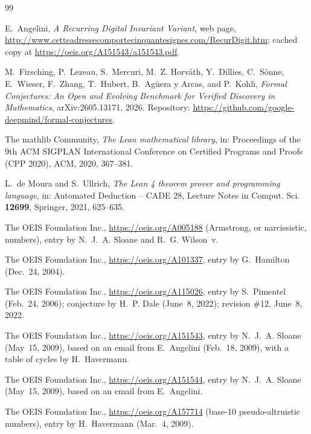 \documentclass[11pt]{amsart}
\theoremstyle{plain}
\theoremstyle{definition}
\begin{document}
{\small
\begin{thebibliography}{99}

E.~Angelini, \emph{A Recurring Digital Invariant Variant}, web page, \url{http://www.cetteadressecomportecinquantesignes.com/RecurDigit.htm}; cached copy at \url{https://oeis.org/A151543/a151543.pdf}.

M.~Firsching, P.~Lezeau, S.~Mercuri, M.~Z. Horv\'ath, Y.~Dillies, C.~S\"onne, E.~Wieser, F.~Zhang, T.~Hubert, B.~Ag\"uera y Arcas, and P.~Kohli, \emph{Formal Conjectures: An Open and Evolving Benchmark for Verified Discovery in Mathematics}, arXiv:2605.13171, 2026. Repository: \url{https://github.com/google-deepmind/formal-conjectures}.

The mathlib Community, \emph{The Lean mathematical library}, in: Proceedings of the 9th ACM SIGPLAN International Conference on Certified Programs and Proofs (CPP 2020), ACM, 2020, 367--381.

L.~de Moura and S.~Ullrich, \emph{The Lean 4 theorem prover and programming language}, in: Automated Deduction -- CADE 28, Lecture Notes in Comput. Sci. \textbf{12699}, Springer, 2021, 625--635.

The OEIS Foundation Inc., \url{https://oeis.org/A005188} (Armstrong, or narcissistic, numbers), entry by N.~J.~A. Sloane and R.~G. Wilson~v.

The OEIS Foundation Inc., \url{https://oeis.org/A101337}, entry by G.~Hamilton (Dec.~24, 2004).

The OEIS Foundation Inc., \url{https://oeis.org/A115026}, entry by S.~Pimentel (Feb.~24, 2006); conjecture by H.~P. Dale (June~8, 2022); revision \#12, June~8, 2022.

The OEIS Foundation Inc., \url{https://oeis.org/A151543}, entry by N.~J.~A. Sloane (May~15, 2009), based on an email from E.~Angelini (Feb.~18, 2009), with a table of cycles by H.~Havermann.

The OEIS Foundation Inc., \url{https://oeis.org/A151544}, entry by N.~J.~A. Sloane (May~15, 2009), based on an email from E.~Angelini.

The OEIS Foundation Inc., \url{https://oeis.org/A157714} (base-10 pseudo-altruistic numbers), entry by H.~Havermann (Mar.~4, 2009).

\end{thebibliography}
}
\end{document}
